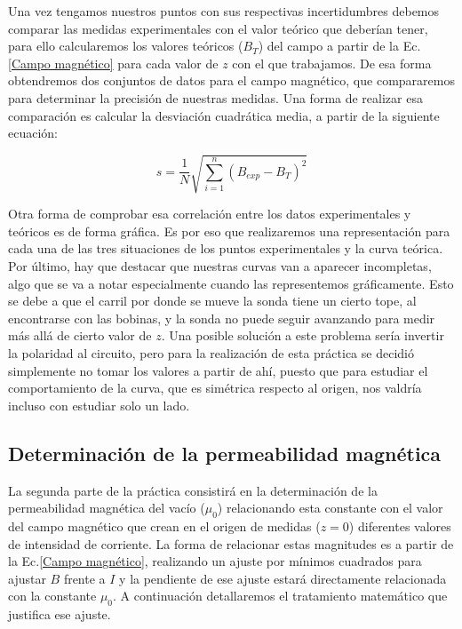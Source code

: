 \documentclass[a4paper,12pt,titlepage]{article}
\begin{document}
Una vez tengamos nuestros puntos con sus respectivas incertidumbres debemos comparar las medidas experimentales con el valor teórico que deberían tener, para ello calcularemos los valores teóricos ($B_T$) del campo a partir de la Ec.\ref{Campo magnético} para cada valor de $z$ con el que trabajamos. De esa forma obtendremos dos conjuntos de datos para el campo magnético, que compararemos para determinar la precisión de nuestras medidas. Una forma de realizar esa comparación es calcular la desviación cuadrática media, a partir de la siguiente ecuación:

\begin{equation}
    s = \frac{1}{N} \sqrt{\sum_{i=1}^{n} (B_{exp} - B_T)^2}
    \label{Desviación cuadrática media}
\end{equation}

Otra forma de comprobar esa correlación entre los datos experimentales y teóricos es de forma gráfica. Es por eso que realizaremos una representación para cada una de las tres situaciones de los puntos experimentales y la curva teórica. Por último, hay que destacar que nuestras curvas van a aparecer incompletas, algo que se va a notar especialmente cuando las representemos gráficamente. Esto se debe a que el carril por donde se mueve la sonda tiene un cierto tope, al encontrarse con las bobinas, y la sonda no puede seguir avanzando para medir más allá de cierto valor de $z$. Una posible solución a este problema sería invertir la polaridad al circuito, pero para la realización de esta práctica se decidió simplemente no tomar los valores a partir de ahí, puesto que para estudiar el comportamiento de la curva, que es simétrica respecto al origen, nos valdría incluso con estudiar solo un lado.

\subsection{Determinación de la permeabilidad magnética}

La segunda parte de la práctica consistirá en la determinación de la permeabilidad magnética del vacío ($\mu_0$) relacionando esta constante con el valor del campo magnético que crean en el origen de medidas ($z=0$) diferentes valores de intensidad de corriente. La forma de relacionar estas magnitudes es a partir de la Ec.\ref{Campo magnético}, realizando un ajuste por mínimos cuadrados para ajustar $B$ frente a $I$ y la pendiente de ese ajuste estará directamente relacionada con la constante $\mu_0$. A continuación detallaremos el tratamiento matemático que justifica ese ajuste.
\end{document}
